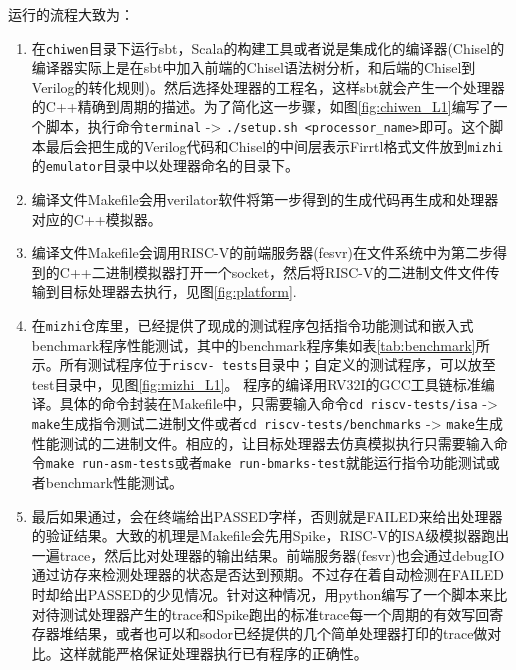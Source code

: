 运行的流程大致为：
\begin{enumerate}[label=(\alph*)]
	\item 在\texttt{chiwen}目录下运行sbt，Scala的构建工具或者说是集成化的编译器(Chisel的编译器实际上是在sbt中加入前端的Chisel语法树分析，和后端的Chisel到Verilog的转化规则)。然后选择处理器的工程名，这样sbt就会产生一个处理器的C++精确到周期的描述。为了简化这一步骤，如图\ref{fig:chiwen_L1}编写了一个脚本，执行命令{\footnotesize \verb|terminal| -> \verb|./setup.sh <processor_name>|}即可。这个脚本最后会把生成的Verilog代码和Chisel的中间层表示Firrtl格式文件放到\texttt{mizhi}的\texttt{emulator}目录中以处理器命名的目录下。
	\item 编译文件Makefile会用verilator软件将第一步得到的生成代码再生成和处理器对应的C++模拟器。
	\item 编译文件Makefile会调用RISC-V的前端服务器(fesvr)在文件系统中为第二步得到的C++二进制模拟器打开一个socket，然后将RISC-V的二进制文件文件传输到目标处理器去执行，见图\ref{fig:platform}.
	\item 在\texttt{mizhi}仓库里，已经提供了现成的测试程序包括指令功能测试和嵌入式benchmark程序性能测试，其中的benchmark程序集如表\ref{tab:benchmark}所示。所有测试程序位于\texttt{riscv- tests}目录中；自定义的测试程序，可以放至test目录中，见图\ref{fig:mizhi_L1}。 程序的编译用RV32I的GCC工具链标准编译。具体的命令封装在Makefile中，只需要输入命令{\footnotesize \verb|cd riscv-tests/isa| -> \verb|make|}生成指令测试二进制文件或者{\footnotesize \verb|cd riscv-tests/benchmarks| -> \verb|make|}生成性能测试的二进制文件。相应的，让目标处理器去仿真模拟执行只需要输入命令{\footnotesize \verb|make run-asm-tests|}或者{\footnotesize \verb|make run-bmarks-test|}就能运行指令功能测试或者benchmark性能测试。
	\item 最后如果通过，会在终端给出PASSED字样，否则就是FAILED来给出处理器的验证结果。大致的机理是Makefile会先用Spike，RISC-V的ISA级模拟器跑出一遍trace，然后比对处理器的输出结果。前端服务器(fesvr)也会通过debugIO通过访存来检测处理器的状态是否达到预期。不过存在着自动检测在FAILED时却给出PASSED的少见情况。针对这种情况，用python编写了一个脚本来比对待测试处理器产生的trace和Spike跑出的标准trace每一个周期的有效写回寄存器堆结果，或者也可以和sodor已经提供的几个简单处理器打印的trace做对比。这样就能严格保证处理器执行已有程序的正确性。
\end{enumerate}

